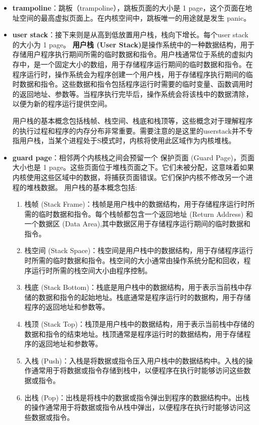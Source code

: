 \begin{itemize}
	\item \textbf{trampoline}：跳板（trampoline），跳板页面的大小是 1 page，这个页面在地址空间的最高虚拟页面上。在内核空间中，跳板唯一的用途就是发生 panic。
	\item \textbf{user stack}：接下来则是从高到低放置用户栈，栈向下增长。每个user stack的大小为 1 page。
	\textbf{用户栈 (User Stack)}是操作系统中的一种数据结构，用于存储用户程序执行期间所需的临时数据和指令。用户栈通常位于系统的虚拟内存中，是一个固定大小的数组，用于存储程序运行期间的临时数据和指令。在程序运行时，操作系统会为程序创建一个用户栈，用于存储程序执行期间的临时数据和指令。这些数据和指令包括程序运行时需要的临时变量、函数调用时的返回地址、参数等。当程序执行完毕后，操作系统会将该栈中的数据清除，以便为新的程序运行提供空间。
	
	用户栈的基本概念包括栈帧、栈空间、栈底和栈顶等，这些概念对于理解程序的执行过程和程序的内存分布非常重要。需要注意的是这里的userstack并不专指用户栈，当某个进程处于S模式时，内核将使用此区域作为内核堆栈。
	\item \textbf{guard page}：相邻两个内核栈之间会预留一个 保护页面 (Guard Page)，页面大小也是 1 page。这些页面位于堆栈页面之下。它们未被分配，这意味着如果内核使用这些区域中的数据，将捕获页面错误。它们保护内核不修改另一个进程的堆栈数据。
	用户栈的基本概念包括:
	
	\begin{enumerate}
		\item 栈帧 (Stack Frame)：栈帧是用户栈中的数据结构，用于存储程序运行时所需的临时数据和指令。每个栈帧都包含一个返回地址 (Return Address) 和一个数据区 (Data Area),其中数据区用于存储程序运行期间的临时数据和指令。
		\item 栈空间 (Stack Space)：栈空间是用户栈中的数据结构，用于存储程序运行时所需的临时数据和指令。栈空间的大小通常由操作系统分配和回收，程序运行时所需的栈空间大小由程序控制。
		\item 栈底 (Stack Bottom)：栈底是用户栈中的数据结构，用于表示当前栈中存储的数据和指令的起始地址。栈底通常是程序运行时的数据构，用于存储程序的返回地址和参数等。
		\item 栈顶 (Stack Top)：栈顶是用户栈中的数据结构，用于表示当前栈中存储的数据和指令的结束地址。栈顶通常是程序运行时的数据结构，用于存储程序的返回地址和参数等。
		\item 入栈 (Push)：入栈是将数据或指令压入用户栈中的数据结构中。入栈的操作通常用于将数据或指令存储到栈中，以便程序在执行时能够访问这些数据或指令。
		\item 出栈 (Pop)：出栈是将栈中的数据或指令弹出到程序的数据结构中。出栈的操作通常用于将数据或指令从栈中弹出，以便程序在执行时能够访问这些数据或指令。
	\end{enumerate}
	

\end{itemize}
